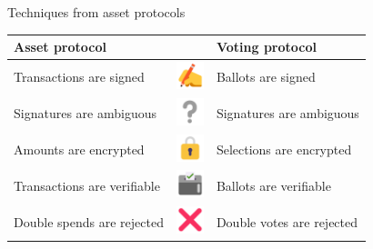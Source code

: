 \documentclass[aspectratio=169]{beamer}
\begin{document}
\begin{frame}{Techniques from asset protocols}
    \begin{table}
        \centering
        \begin{tabular}{>{\arraybackslash}m{130px} >{\arraybackslash}m{40px} >{\arraybackslash}m{130px}}
            \textbf{Asset protocol} & & \textbf{Voting protocol} \\
            \hline
            Transactions are signed & \includegraphics[width=30px]{images/sign.png} & Ballots are signed \\
            Signatures are ambiguous & \includegraphics[width=30px]{images/question.png} & Signatures are ambiguous \\
            Amounts are encrypted & \includegraphics[width=30px]{images/lock.png} & Selections are encrypted \\
            Transactions are verifiable & \includegraphics[width=30px]{images/ballot.png} & Ballots are verifiable \\
            Double spends are rejected & \includegraphics[width=30px]{images/x.png} & Double votes are rejected \\
        \end{tabular}
    \end{table}
\end{frame}
\end{document}
